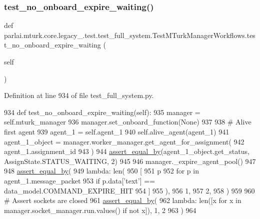 \subsubsection{\texorpdfstring{test\+\_\+no\+\_\+onboard\+\_\+expire\+\_\+waiting()}{test\_no\_onboard\_expire\_waiting()}}
{\footnotesize\ttfamily def parlai.\+mturk.\+core.\+legacy\+\_.\+test.\+test\+\_\+full\+\_\+system.\+Test\+M\+Turk\+Manager\+Workflows.\+test\+\_\+no\+\_\+onboard\+\_\+expire\+\_\+waiting (\begin{DoxyParamCaption}\item[{}]{self }\end{DoxyParamCaption})}



Definition at line 934 of file test\+\_\+full\+\_\+system.\+py.


\begin{DoxyCode}
934     \textcolor{keyword}{def }test\_no\_onboard\_expire\_waiting(self):
935         manager = self.mturk\_manager
936         manager.set\_onboard\_function(\textcolor{keywordtype}{None})
937 
938         \textcolor{comment}{# Alive first agent}
939         agent\_1 = self.agent\_1
940         self.alive\_agent(agent\_1)
941         agent\_1\_object = manager.worker\_manager.get\_agent\_for\_assignment(
942             agent\_1.assignment\_id
943         )
944         \hyperlink{namespaceparlai_1_1mturk_1_1core_1_1test_1_1test__full__system_a0b463246d35658a2e422010f13dcf819}{assert\_equal\_by}(agent\_1\_object.get\_status, AssignState.STATUS\_WAITING, 2)
945 
946         manager.\_expire\_agent\_pool()
947 
948         \hyperlink{namespaceparlai_1_1mturk_1_1core_1_1test_1_1test__full__system_a0b463246d35658a2e422010f13dcf819}{assert\_equal\_by}(
949             \textcolor{keyword}{lambda}: len(
950                 [
951                     p
952                     \textcolor{keywordflow}{for} p \textcolor{keywordflow}{in} agent\_1.message\_packet
953                     \textcolor{keywordflow}{if} p.data[\textcolor{stringliteral}{'text'}] == data\_model.COMMAND\_EXPIRE\_HIT
954                 ]
955             ),
956             1,
957             2,
958         )
959 
960         \textcolor{comment}{# Assert sockets are closed}
961         \hyperlink{namespaceparlai_1_1mturk_1_1core_1_1test_1_1test__full__system_a0b463246d35658a2e422010f13dcf819}{assert\_equal\_by}(
962             \textcolor{keyword}{lambda}: len([x \textcolor{keywordflow}{for} x \textcolor{keywordflow}{in} manager.socket\_manager.run.values() \textcolor{keywordflow}{if} \textcolor{keywordflow}{not} x]), 1, 2
963         )
964 
\end{DoxyCode}
